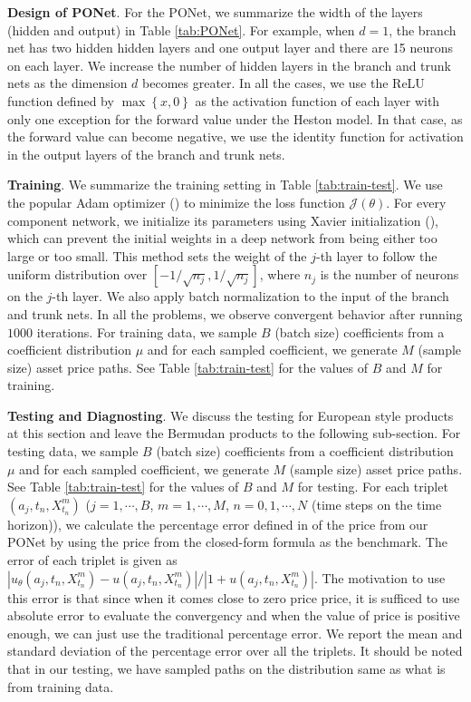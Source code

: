 \documentclass[11pt,a4paper]{article}
\theoremstyle{remark}
\begin{document}
	\smallskip
	\noindent\textbf{Design of PONet}. For the PONet, we summarize the width of the layers (hidden and output) in Table \ref{tab:PONet}. For example, when $d=1$, the branch net has two hidden hidden layers and one output layer and there are 15 neurons on each layer. We increase the number of hidden layers in the branch and trunk nets as the dimension $d$ becomes greater. In all the cases, we use the ReLU function defined by $\max\left\{x, 0\right\}$ as the activation function of each layer with only one exception for the forward value under the Heston model. In that case, as the forward value can become negative, we use the identity function for activation in the output layers of the branch and trunk nets. 
	
	\smallskip
	\noindent\textbf{Training}. We summarize the training setting in Table \ref{tab:train-test}. We use the popular Adam optimizer (\cite{kingma2014adam}) to minimize the loss function $\mathcal{J}(\theta)$. For every component network, we initialize its parameters using Xavier initialization (\cite{glorot2010understanding}), which can prevent the initial weights in a deep network from being either too large or too small. This method sets the weight of the $j$-th layer to follow the uniform distribution over $[-1/\sqrt{n_{j}}, 1/\sqrt{n_{j}}]$, where $n_j$ is the number of neurons on the $j$-th layer. We also apply batch normalization to the input of the branch and trunk nets. In all the problems, we observe convergent behavior after running $1000$ iterations. For training data, we sample $B$ (batch size) coefficients from a coefficient distribution $\mu$ and for each sampled coefficient, we generate $M$ (sample size) asset price paths. See Table \ref{tab:train-test} for the values of $B$ and $M$ for training. 
	
	
	\smallskip
	\noindent\textbf{Testing and Diagnosting}. We discuss the testing for European style products at this section and leave the Bermudan products to the following sub-section. For testing data, we sample $B$ (batch size) coefficients from a coefficient distribution $\mu$ and for each sampled coefficient, we generate $M$ (sample size) asset price paths. See Table \ref{tab:train-test} for the values of $B$ and $M$ for testing. For each triplet $(a_j,t_n,X_{t_n}^m)$ ($j=1,\cdots, B$, $m=1,\cdots,M$, $n=0,1,\cdots, N$ (time steps on the time horizon)), we calculate the percentage error defined in \cite{berner2020numerically} of the price from our PONet by using the price from the closed-form formula as the benchmark. The error of each triplet is given as $|u_{\theta}(a_j,t_n,X_{t_n}^m) - u(a_j,t_n,X_{t_n}^m)|/|1 + u(a_j,t_n,X_{t_n}^m)|$. The motivation to use this error is that since when it comes close to zero price price, it is sufficed to use absolute error to evaluate the convergency and when the value of price is positive enough, we can just use the traditional percentage error. We report the mean and standard deviation of the percentage error over all the triplets. It should be noted that in our testing, we have sampled paths on the distribution same as what is from training data. 
	
\end{document}
